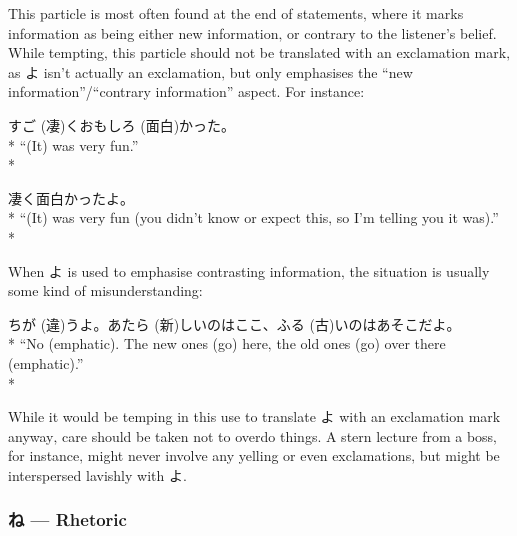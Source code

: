\documentclass[11pt, b5paper, twoside, openright, onecolumn]{book}
\makeatletter
\newcommand*{\rubystack}[2]{{\relscale{0.5}%
  \begin{tabular}[b]{@{}c@{}}%
    {#1}\\%
   {\textscale{2}{#2}}%
  \end{tabular}}%
}
\DeclareRobustCommand*{\ruby}[2]{%
  \mbox{%
    \setlength{\parskip}{0ex}%
    \BeginAccSupp{method=pdfstringdef,ActualText={#1}}%
      \rubystack{\phantom{#2}}{#1}%
      \llap{%
        \rubystack{#2}{\phantom{#1}}%
      }%
    \EndAccSupp{}%
  }%
}
\renewcommand*{\ruby}[2]{#2 (#1)}%
\newenvironment{exampleblock}{
\setlength{\parindent}{0.6in}
\begin{minipage}[t]{\dimexpr\textwidth-\parindent}}
{\end{minipage}}
\makeatother
\begin{document}
This particle is most often found at the end of statements‚ where it marks information as being either new information‚ or contrary to the listener’s belief. While tempting‚ this particle should not be translated with an exclamation mark‚ as よ isn’t actually an exclamation‚ but only emphasises the “new information”/“contrary information” aspect. For instance:

\vspace{0.4cm}
\begin{exampleblock}
\ruby{凄}{すご}く\ruby{面白}{おもしろ}かった。 \\* 
“(It) was very fun.” \\* 
\end{exampleblock}
\vspace{0.2cm}

\begin{exampleblock}
凄く面白かったよ。 \\* 
“(It) was very fun (you didn’t know or expect this‚ so I’m telling you it was).” \\* 
\end{exampleblock}
\vspace{0.2cm}

When よ is used to emphasise contrasting information‚ the situation is usually some kind of misunderstanding:

\vspace{0.4cm}
\begin{exampleblock}
\ruby{違}{ちが}うよ。\ruby{新}{あたら}しいのはここ、\ruby{古}{ふる}いのはあそこだよ。 \\* 
“No (emphatic). The new ones (go) here‚ the old ones (go) over there (emphatic).” \\* 
\end{exampleblock}
\vspace{0.2cm}

While it would be temping in this use to translate よ with an exclamation mark anyway‚ care should be taken not to overdo things. A stern lecture from a boss‚ for instance‚ might never involve any yelling or even exclamations‚ but might be interspersed lavishly with よ.

\subsubsection{ね — Rhetoric}
\end{document}
